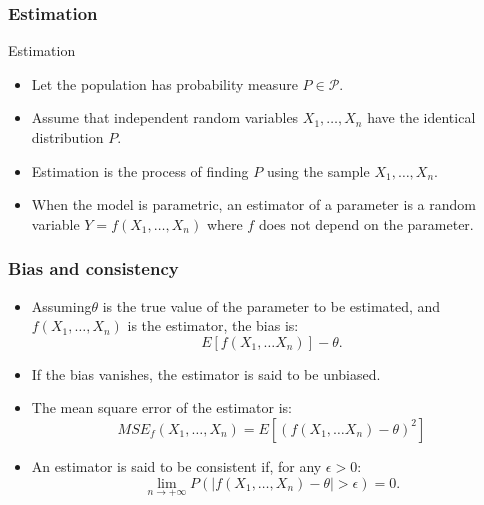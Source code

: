 \documentclass[main.tex]{subfiles}
\begin{document}
\begin{frame}
    \frametitle{Estimation}
\begin{block}{Estimation}
    \begin{itemize}
        \item<+-> Let the population has probability measure $P \in \mathcal{P}$.
        \item<+-> Assume that independent random variables $X_1,\dots, X_n$ have the identical distribution $P$.
        \item<+-> Estimation is the process of finding $P$ using the sample $X_1,\dots,X_n$.
        \item<+-> When the model is parametric, an estimator of a parameter is a 
        random variable $Y=f\left( X_1,\dots ,X_n \right)$ where $f$ does not depend on the parameter.
    \end{itemize}
 \end{block}
\end{frame}
\begin{frame}
    \frametitle{Bias and consistency}
\begin{itemize}
\item<+-> Assuming$\theta$ is the true value of the parameter to be estimated,
and $f\left( X_1, \dots, X_n \right)$ is the estimator, the bias is:
\begin{equation}
    E\left[ f\left( X_1,\dots X_n \right) \right] - \theta.
\end{equation}
\item<+-> If the bias vanishes, the estimator is said to be unbiased.
\item<+-> The mean square error of the estimator is:
\begin{equation}
    MSE_f(X_1,\dots, X_n)= E\left[ \left( f(X_1, \dots X_n) - \theta \right)^2 \right]
\end{equation}
\item<+-> An estimator is said to be consistent if, for any $\epsilon > 0$:
\begin{equation}
    \lim_{n \to +\infty}P\left( \lvert f(X_1,\dots,X_n) - \theta\rvert > \epsilon \right) = 0.
\end{equation} 
\end{itemize}
\end{frame}
\end{document}
